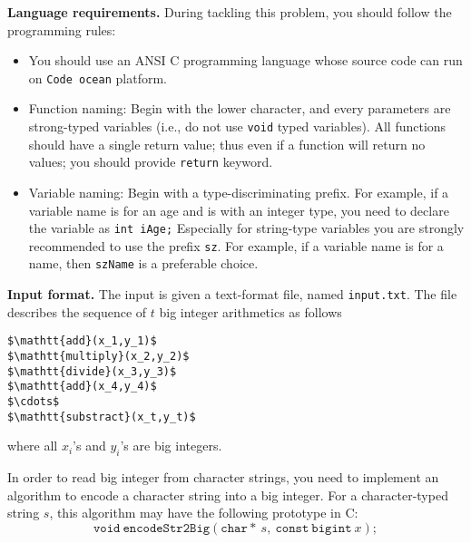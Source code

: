 \documentclass{article}
\begin{document}
\bigskip
\noindent\textbf{Language requirements. }%
During tackling this problem, you should follow the programming rules:
\begin{itemize}
\item You should use an ANSI C programming language whose source code can run on \texttt{Code ocean} platform. 
\item Function naming: Begin with the lower character, and every parameters are strong-typed variables (i.e., do not use \texttt{void} typed variables).
	All functions should have a single return value; thus even if a function will return no values; you should provide \texttt{return} keyword.
\item Variable naming: Begin with a type-discriminating prefix. For example, if a variable name is for an age and is with an integer type,
	you need to declare the variable as \texttt{int iAge;}  Especially for string-type variables you are strongly recommended to use the prefix \texttt{sz}.
	For example, if a variable name is for a name, then \texttt{szName} is a preferable choice.
\end{itemize}


\bigskip
\noindent\textbf{Input format.} %
The input is given a text-format file, named \texttt{input.txt}.
The file  describes the sequence of $t$ big integer arithmetics as follows
\begin{lstlisting}[backgroundcolor=\color{yellow!40}]
$\mathtt{add}(x_1,y_1)$
$\mathtt{multiply}(x_2,y_2)$
$\mathtt{divide}(x_3,y_3)$
$\mathtt{add}(x_4,y_4)$
$\cdots$
$\mathtt{substract}(x_t,y_t)$
\end{lstlisting}
where all $x_i$'s and $y_i$'s are big integers.

In order to read big integer from character strings, you need to implement an algorithm to encode a character string into a big integer.
For a character-typed string $s$,
this algorithm may have the following prototype in C:
\begin{equation*}
\mathtt{void}\ \mathtt{encodeStr2Big}(\mathtt{char*}\ s,\ \mathtt{const\ bigint}\ x);
\end{equation*}
\end{document}

